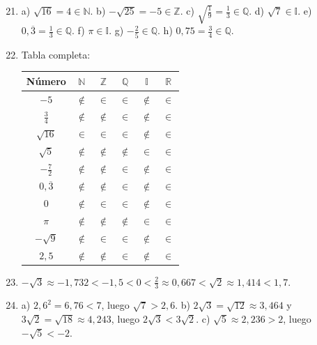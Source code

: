 \documentclass[12pt, letterpaper]{article}
\begin{document}
  \begin{enumerate}[leftmargin=*, label=\textbf{\arabic*.}]
    \setcounter{enumi}{20}
    \item a) $\sqrt{16} = 4 \in \mathbb{N}$. \quad b) $-\sqrt{25} = -5 \in \mathbb{Z}$. \quad c) $\sqrt{\frac{1}{9}} = \frac{1}{3} \in \mathbb{Q}$. \quad d) $\sqrt{7} \in \mathbb{I}$. \quad e) $0{,}\overline{3} = \frac{1}{3} \in \mathbb{Q}$. \quad f) $\pi \in \mathbb{I}$. \quad g) $-\frac{2}{5} \in \mathbb{Q}$. \quad h) $0{,}75 = \frac{3}{4} \in \mathbb{Q}$.

    \item Tabla completa:
          \begin{center}
            \renewcommand{\arraystretch}{1.5}
            \begin{tabular}{|c|c|c|c|c|c|}
              \hline
              \textbf{Número} & $\mathbb{N}$ & $\mathbb{Z}$ & $\mathbb{Q}$ & $\mathbb{I}$ & $\mathbb{R}$ \\ \hline
              $-5$ & $\notin$ & $\in$ & $\in$ & $\notin$ & $\in$ \\ \hline
              $\frac{3}{4}$ & $\notin$ & $\notin$ & $\in$ & $\notin$ & $\in$ \\ \hline
              $\sqrt{16}$ & $\in$ & $\in$ & $\in$ & $\notin$ & $\in$ \\ \hline
              $\sqrt{5}$ & $\notin$ & $\notin$ & $\notin$ & $\in$ & $\in$ \\ \hline
              $-\frac{7}{2}$ & $\notin$ & $\notin$ & $\in$ & $\notin$ & $\in$ \\ \hline
              $0{,}\overline{3}$ & $\notin$ & $\notin$ & $\in$ & $\notin$ & $\in$ \\ \hline
              $0$ & $\notin$ & $\in$ & $\in$ & $\notin$ & $\in$ \\ \hline
              $\pi$ & $\notin$ & $\notin$ & $\notin$ & $\in$ & $\in$ \\ \hline
              $-\sqrt{9}$ & $\notin$ & $\in$ & $\in$ & $\notin$ & $\in$ \\ \hline
              $2{,}5$ & $\notin$ & $\notin$ & $\in$ & $\notin$ & $\in$ \\ \hline
            \end{tabular}
          \end{center}

    \item $-\sqrt{3} \approx -1{,}732 < -1{,}5 < 0 < \frac{2}{3} \approx 0{,}667 < \sqrt{2} \approx 1{,}414 < 1{,}7$.

    \item a) $2{,}6^2 = 6{,}76 < 7$, luego $\sqrt{7} > 2{,}6$. \quad b) $2\sqrt{3} = \sqrt{12} \approx 3{,}464$ y $3\sqrt{2} = \sqrt{18} \approx 4{,}243$, luego $2\sqrt{3} < 3\sqrt{2}$. \quad c) $\sqrt{5} \approx 2{,}236 > 2$, luego $-\sqrt{5} < -2$.


\end{enumerate}
\end{document}
